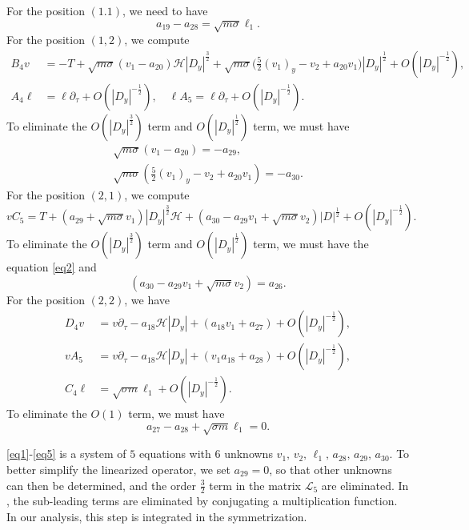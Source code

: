 \documentclass[12pt]{amsart}
\theoremstyle{remark}
\theoremstyle{definition}
\numberwithin{equation}{section}
\newcommand{\p}{\partial}
\newcommand{\f}{\frac}
\newcommand{\mH}{\mathcal{H}}
\newcommand{\mL}{\mathcal{L}}
\begin{document}
For the position $(1.1)$, we need to have
\begin{equation}\label{eq1}
a_{19} - a_{28} = \sqrt{m\sigma} \ell_1.
\end{equation}
For the position $(1,2)$, we compute
\begin{align*}
B_4 v &= -T + \sqrt{m\sigma}(v_1-a_{20}) \mH|D_y|^\f32 + \sqrt{m\sigma}\Big(\f52(v_1)_y - v_2 + a_{20}v_1\Big)|D_y|^\f12 + O(|D_y|^{-\f12}),  \\
A_4 \ell &= \ell \p_\tau + O(|D_y|^{-\f12}),\quad
\ell A_5  = \ell\p_\tau + O(|D_y|^{-\f12}).
\end{align*}
To eliminate the $O(|D_y|^{\f32})$ term and $O(|D_y|^{\f12})$ term, we must have
\begin{align}
  \sqrt{m\sigma}(v_1-a_{20}) = - a_{29},\label{eq2} \\
 \sqrt{m\sigma} \left(\f52(v_1)_y - v_2 + a_{20}v_1 \right) = - a_{30}\label{eq3}.
\end{align}
For the position $(2,1)$, we compute 
\begin{equation*}
    vC_5 = T+(a_{29}+\sqrt{m\sigma}v_1)|D_y|^{\f32}\mH+(a_{30}-a_{29}v_1+\sqrt{m\sigma}v_2)|D|^{\f12}+O(|D_y|^{-\f12}).
\end{equation*}
To eliminate the $O(|D_y|^{\f32})$ term and $O(|D_y|^{\f12})$ term, we must have the equation \eqref{eq2} and 
\begin{equation} \label{eq4}
(a_{30}-a_{29}v_1+\sqrt{m\sigma}v_2)=a_{26}.
\end{equation}
For the position $(2,2)$, we have
\begin{align*}
D_4v&= v\p_{\tau}-a_{18}\mH|D_y|+(a_{18}v_1+a_{27})+O(|D_y|^{-\f12}),\\
vA_5&= v\p_{\tau}-a_{18}\mH|D_y|+(v_1a_{18}+a_{28}) +O(|D_y|^{-\f12}),\\
C_4\ell&=\sqrt{\sigma m}\ell_1+O(|D_y|^{-\f12}).
\end{align*}
To eliminate the $O(1)$ term, we must have
\begin{equation}\label{eq5}
    a_{27}- a_{28} + \sqrt{\sigma m}\ell_1 = 0.
\end{equation}

\eqref{eq1}-\eqref{eq5} is a system of $5$ equations with $6$ unknowns $v_1,\,v_2,\,\ell_1,\,a_{28},\,a_{29},\,a_{30}$.
To better simplify the linearized operator, we set $a_{29} = 0$, so that other unknowns can then be determined, and the order $\f32$ term in the matrix $\mL_5$ are eliminated.
In \cite{BHM}, the sub-leading terms are eliminated by conjugating a multiplication function.
In our analysis, this step is integrated in the symmetrization.
\end{document}
